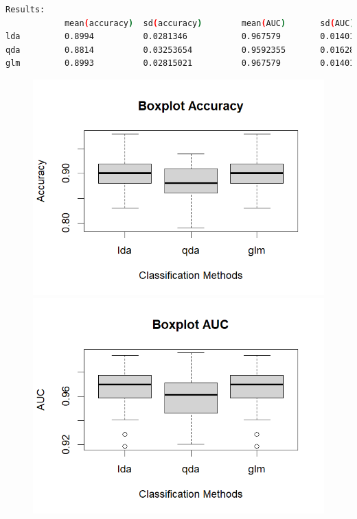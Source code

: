 \documentclass[11pt,a4paper]{article}
\begin{document}
\begin{lstlisting}[language=bash,basicstyle=\tiny,tabsize=2,frame = single]
Results:
            mean(accuracy)  sd(accuracy)        mean(AUC)       sd(AUC)
lda         0.8994          0.0281346           0.967579        0.01401571
qda         0.8814          0.03253654          0.9592355       0.01628317
glm         0.8993          0.02815021          0.967579        0.01401571
\end{lstlisting}
\vspace{-0.5cm}
\begin{figure}[h]
	\hspace{-1.80cm}
	\begin{minipage}{.57\textwidth} 
	\includegraphics[scale=.8]{imgs/boxplot_accuracy.png}
    \end{minipage}
	\begin{minipage}{0.5\textwidth} 
		\includegraphics[scale=.8]{imgs/boxplot_AUC.png}
	\end{minipage}
\end{figure}
\end{document}
